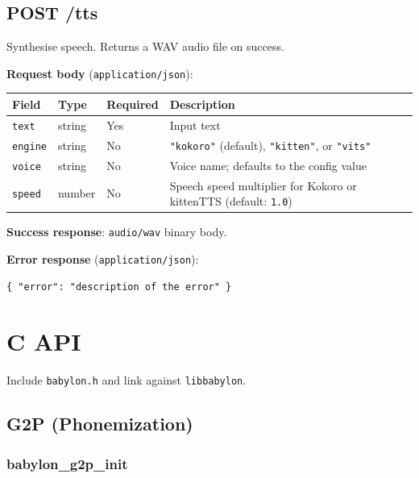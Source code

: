 \documentclass[12pt,a4paper]{article}
\begin{document}
\subsection{POST /tts}

Synthesise speech. Returns a WAV audio file on success.

\textbf{Request body} (\texttt{application/json}):

\begin{center}
\begin{tabular}{llll}
\toprule
\textbf{Field} & \textbf{Type} & \textbf{Required} & \textbf{Description} \\
\midrule
\texttt{text}   & string & Yes & Input text \\
\texttt{engine} & string & No  & \texttt{"kokoro"} (default), \texttt{"kitten"}, or \texttt{"vits"} \\
\texttt{voice}  & string & No  & Voice name; defaults to the config value \\
\texttt{speed}  & number & No  & Speech speed multiplier for Kokoro or kittenTTS (default: \texttt{1.0}) \\
\bottomrule
\end{tabular}
\end{center}

\textbf{Success response}: \texttt{audio/wav} binary body.

\textbf{Error response} (\texttt{application/json}):

\begin{lstlisting}[language={}]
{ "error": "description of the error" }
\end{lstlisting}

\section{C API}
\label{sec:c-api}

Include \texttt{babylon.h} and link against \texttt{libbabylon}.

\subsection{G2P (Phonemization)}

\subsubsection{babylon\_g2p\_init}
\end{document}
